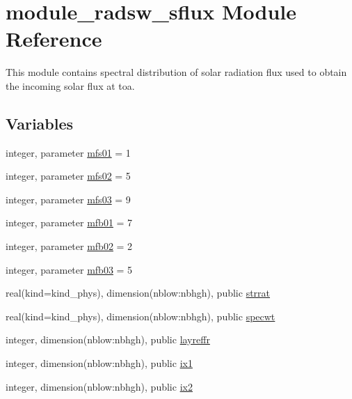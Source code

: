 \hypertarget{namespacemodule__radsw__sflux}{}\section{module\+\_\+radsw\+\_\+sflux Module Reference}
\label{namespacemodule__radsw__sflux}


This module contains spectral distribution of solar radiation flux used to obtain the incoming solar flux at toa.  


\subsection*{Variables}
\begin{DoxyCompactItemize}
\item 
integer, parameter \hyperlink{namespacemodule__radsw__sflux_aba08e6f9d4dccd130e87300e6fd0ed58}{mfs01} = 1
\item 
integer, parameter \hyperlink{namespacemodule__radsw__sflux_acca3bbc0dd125a3e8c3734c58c48e79b}{mfs02} = 5
\item 
integer, parameter \hyperlink{namespacemodule__radsw__sflux_a5bd55a5106ce82bd47250d38d9b8f22a}{mfs03} = 9
\item 
integer, parameter \hyperlink{namespacemodule__radsw__sflux_a08a0f1278962ac27634169ea7632bc70}{mfb01} = 7
\item 
integer, parameter \hyperlink{namespacemodule__radsw__sflux_afdf71cabed6ae0076d98ff0e563dbc61}{mfb02} = 2
\item 
integer, parameter \hyperlink{namespacemodule__radsw__sflux_a2e3b510d781c596fa0bb9b1359a988dd}{mfb03} = 5
\item 
real(kind=kind\+\_\+phys), dimension(nblow\+:nbhgh), public \hyperlink{namespacemodule__radsw__sflux_aee2a2275da028b0960c5c1c8a34f46cf}{strrat}
\item 
real(kind=kind\+\_\+phys), dimension(nblow\+:nbhgh), public \hyperlink{namespacemodule__radsw__sflux_a7d1a386e92555bcb09239ab098d8b398}{specwt}
\item 
integer, dimension(nblow\+:nbhgh), public \hyperlink{namespacemodule__radsw__sflux_a90c56da1bcadbea0b42e12487c1c1eec}{layreffr}
\item 
integer, dimension(nblow\+:nbhgh), public \hyperlink{namespacemodule__radsw__sflux_ac2864b4501e9bc3804d45d14f4aab472}{ix1}
\item 
integer, dimension(nblow\+:nbhgh), public \hyperlink{namespacemodule__radsw__sflux_a92703c3e826f7e81267c6b7ae31ebe42}{ix2}

\end{DoxyCompactItemize}
